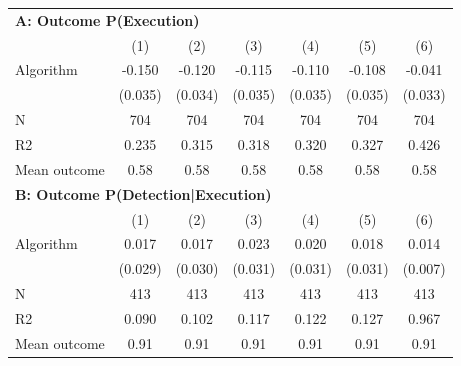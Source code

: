 \begin{tabular}{lcccccc} \toprule
\multicolumn{7}{l}{\textbf{A: Outcome P(Execution)}} \\ \multicolumn{1}{l}{} & (1) & (2) & (3) & (4) & (5) & (6) \\ \midrule
Algorithm   &      -0.150\sym{***}&      -0.120\sym{***}&      -0.115\sym{***}&      -0.110\sym{***}&      -0.108\sym{***}&      -0.041         \\
            &     (0.035)         &     (0.034)         &     (0.035)         &     (0.035)         &     (0.035)         &     (0.033)         \\
\midrule
N           &         704         &         704         &         704         &         704         &         704         &         704         \\
R2          &       0.235         &       0.315         &       0.318         &       0.320         &       0.327         &       0.426         \\
Mean outcome&        0.58         &        0.58         &        0.58         &        0.58         &        0.58         &        0.58         \\

\midrule \multicolumn{7}{l}{\textbf{B: Outcome P(Detection|Execution)}} \\ \multicolumn{1}{l}{} & (1) & (2) & (3) & (4) & (5) & (6) \\ \midrule
Algorithm   &       0.017         &       0.017         &       0.023         &       0.020         &       0.018         &       0.014\sym{**} \\
            &     (0.029)         &     (0.030)         &     (0.031)         &     (0.031)         &     (0.031)         &     (0.007)         \\
\midrule
N           &         413         &         413         &         413         &         413         &         413         &         413         \\
R2          &       0.090         &       0.102         &       0.117         &       0.122         &       0.127         &       0.967         \\
Mean outcome&        0.91         &        0.91         &        0.91         &        0.91         &        0.91         &        0.91         \\


\end{tabular}
